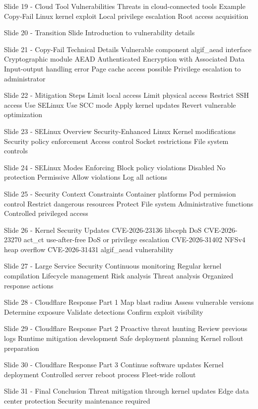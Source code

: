     Slide 19 - Cloud Tool Vulnerabilities
      Threats in cloud-connected tools
      Example Copy-Fail
      Linux kernel exploit
      Local privilege escalation
      Root access acquisition

    Slide 20 - Transition Slide
      Introduction to vulnerability details

    Slide 21 - Copy-Fail Technical Details
      Vulnerable component
        algif_aead interface
      Cryptographic module
      AEAD
        Authenticated Encryption with Associated Data
      Input-output handling error
      Page cache access possible
      Privilege escalation to administrator

    Slide 22 - Mitigation Steps
      Limit local access
      Limit physical access
      Restrict SSH access
      Use SELinux
      Use SCC mode
      Apply kernel updates
      Revert vulnerable optimization

    Slide 23 - SELinux Overview
      Security-Enhanced Linux
      Kernel modifications
      Security policy enforcement
      Access control
      Socket restrictions
      File system controls

    Slide 24 - SELinux Modes
      Enforcing
        Block policy violations
      Disabled
        No protection
      Permissive
        Allow violations
        Log all actions

    Slide 25 - Security Context Constraints
      Container platforms
      Pod permission control
      Restrict dangerous resources
      Protect
        File system
        Administrative functions
      Controlled privileged access

    Slide 26 - Kernel Security Updates
      CVE-2026-23136
        libceph DoS
      CVE-2026-23270
        act_ct use-after-free
        DoS or privilege escalation
      CVE-2026-31402
        NFSv4 heap overflow
      CVE-2026-31431
        algif_aead vulnerability

    Slide 27 - Large Service Security
      Continuous monitoring
      Regular kernel compilation
      Lifecycle management
      Risk analysis
      Threat analysis
      Organized response actions

    Slide 28 - Cloudflare Response Part 1
      Map blast radius
      Assess vulnerable versions
      Determine exposure
      Validate detections
      Confirm exploit visibility

    Slide 29 - Cloudflare Response Part 2
      Proactive threat hunting
      Review previous logs
      Runtime mitigation development
      Safe deployment planning
      Kernel rollout preparation

    Slide 30 - Cloudflare Response Part 3
      Continue software updates
      Kernel deployment
      Controlled server reboot process
      Fleet-wide rollout

    Slide 31 - Final Conclusion
      Threat mitigation through kernel updates
      Edge data center protection
      Security maintenance required


